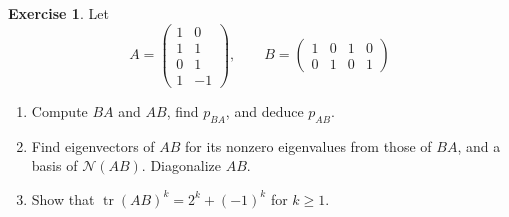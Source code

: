 \documentclass[12pt]{article}
\DeclareMathOperator{\tr}{tr}
\theoremstyle{definition}
\newtheorem{exercise}{Exercise}
\begin{document}
\begin{exercise}\label{r7-ex-ab-ba}
Let
\[
A=\begin{pmatrix}1&0\\1&1\\0&1\\1&-1\end{pmatrix},\qquad B=\begin{pmatrix}1&0&1&0\\0&1&0&1\end{pmatrix}
\]
\begin{enumerate}
\item Compute \(BA\) and \(AB\), find \(p_{BA}\), and deduce \(p_{AB}\).
\item Find eigenvectors of \(AB\) for its nonzero eigenvalues from those of \(BA\), and a basis of \(\mathcal N(AB)\).
Diagonalize \(AB\).
\item Show that \(\tr(AB)^k=2^k+(-1)^k\) for \(k\geqslant1\).
\end{enumerate}
\end{exercise}
\end{document}
